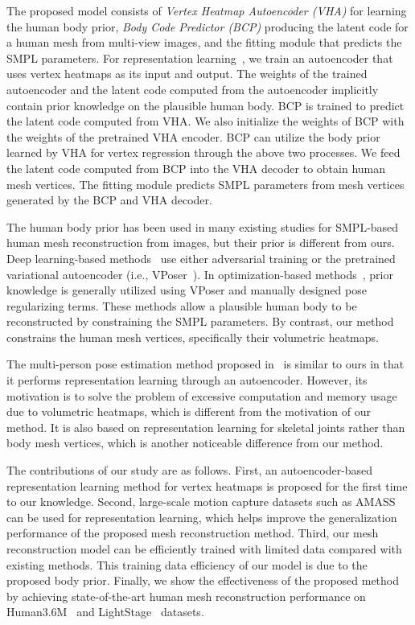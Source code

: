 \documentclass{article}
\begin{document}
The proposed model consists of \emph{Vertex Heatmap Autoencoder (VHA)} for learning the human body prior, \emph{Body Code Predictor (BCP)} producing the latent code for a human mesh from multi-view images, and the fitting module that predicts the SMPL parameters. For representation learning~\cite{ radford2015unsupervised, goodfellow2016deep}, we train an autoencoder that uses vertex heatmaps as its input and output. The weights of the trained autoencoder and the latent code computed from the autoencoder implicitly contain prior knowledge on the plausible human body. BCP is trained to predict the latent code computed from VHA. We also initialize the weights of BCP with the weights of the pretrained VHA encoder. BCP can utilize the body prior learned by VHA for vertex regression through the above two processes. We feed the latent code computed from BCP into the VHA decoder to obtain human mesh vertices. The fitting module predicts SMPL parameters from mesh vertices generated by the BCP and VHA decoder. 

The human body prior has been used in many existing studies for SMPL-based human mesh reconstruction from images, but their prior is different from ours. Deep learning-based methods~\cite{2018_Kanazawa, choi2022learning} use either adversarial training or the pretrained variational autoencoder (i.e., VPoser~\cite{SMPLify_X_2019_Pavlakos}). In optimization-based methods~\cite{Chun_2023_WACV, lightcap2021, SMPLify_X_2019_Pavlakos, Bogo_ECCV_2016}, prior knowledge is generally utilized using VPoser and manually designed pose regularizing terms. These methods allow a plausible human body to be reconstructed by constraining the SMPL parameters. By contrast, our method constrains the human mesh vertices, specifically their volumetric heatmaps.

The multi-person pose estimation method proposed in~\cite{fabbri2020compressed} is similar to ours in that it performs representation learning through an autoencoder. However, its motivation is to solve the problem of excessive computation and memory usage due to volumetric heatmaps, which is different from the motivation of our method. It is also based on representation learning for skeletal joints rather than body mesh vertices, which is another noticeable difference from our method.

The contributions of our study are as follows. First, an autoencoder-based representation learning method for vertex heatmaps is proposed for the first time to our knowledge. Second, large-scale motion capture datasets such as AMASS~\cite{moshpp_AMASS_2019} can be used for representation learning, which helps improve the generalization performance of the proposed mesh reconstruction method. Third, our mesh reconstruction model can be efficiently trained with limited data compared with existing methods. This training data efficiency of our model is due to the proposed body prior. Finally, we show the effectiveness of the proposed method by achieving state-of-the-art human mesh reconstruction performance on Human3.6M~\cite{2014_H36M} and LightStage~\cite{peng2021neural} datasets.
\end{document}
